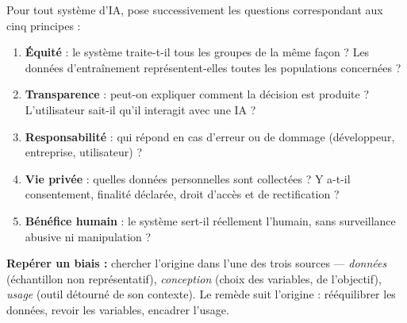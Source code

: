 \documentclass[11pt]{article}
\begin{document}
\begin{methode}
Pour tout système d'IA, pose successivement les questions correspondant aux cinq principes :
\begin{enumerate}
\item \textbf{Équité} : le système traite-t-il tous les groupes de la même façon ? Les données d'entraînement représentent-elles toutes les populations concernées ?
\item \textbf{Transparence} : peut-on expliquer comment la décision est produite ? L'utilisateur sait-il qu'il interagit avec une IA ?
\item \textbf{Responsabilité} : qui répond en cas d'erreur ou de dommage (développeur, entreprise, utilisateur) ?
\item \textbf{Vie privée} : quelles données personnelles sont collectées ? Y a-t-il consentement, finalité déclarée, droit d'accès et de rectification ?
\item \textbf{Bénéfice humain} : le système sert-il réellement l'humain, sans surveillance abusive ni manipulation ?
\end{enumerate}
\textbf{Repérer un biais :} chercher l'origine dans l'une des trois sources — \emph{données} (échantillon non représentatif), \emph{conception} (choix des variables, de l'objectif), \emph{usage} (outil détourné de son contexte). Le remède suit l'origine : rééquilibrer les données, revoir les variables, encadrer l'usage.
\end{methode}
\end{document}
